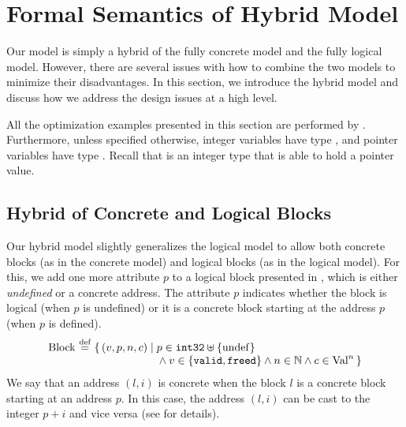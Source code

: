 \section{Formal Semantics of Hybrid Model}
\label{sec:intptrcast:formal-semantics}

Our model is simply a hybrid of the fully concrete
model and the fully logical model. However, there are several issues
with how to combine the two models to minimize their disadvantages.
In this section, we introduce the hybrid model and discuss how
we address the design issues at a high level.  %

All the optimization examples presented in this section are performed by .
Furthermore, unless specified otherwise, integer variables have type , and pointer
variables have type .  Recall that  is an integer type that is able to
hold a pointer value.


\subsection{Hybrid of Concrete and Logical Blocks}
\label{sec:intptrcast:formal-semantics:representation}

Our hybrid model slightly generalizes the logical model to allow
both concrete blocks (as in the concrete model) and logical blocks (as
in the logical model). For this, we add one more attribute $p$ to a
logical block presented in ,
which is either \emph{undefined} or a concrete address.
The attribute $p$ indicates whether the block is logical (when $p$ is
undefined) or it is a concrete block starting at the address $p$ (when
$p$ is defined).
\[
\begin{array}{@{}l@{~}c@{~}l@{}}
\mathrm{Block} &\defeq&
\setof{(v, p, n, c) \suchthat
  p \in \mathtt{int32}\uplus\setofz{\mathrm{undef}} \\
&&\qquad\qquad\quad~~
  {}\land v \in \setofz{\rtlvalid,\rtlfreed} \land n \in \Nat \land c \in \rtlVal^n }
\end{array}
\]
We say that an address $(l,i)$ is concrete when the block $l$ is a
concrete block starting at an address $p$. 
In this case, the address $(l,i)$ can be cast to the integer $p+i$
and vice versa (see  for details).

